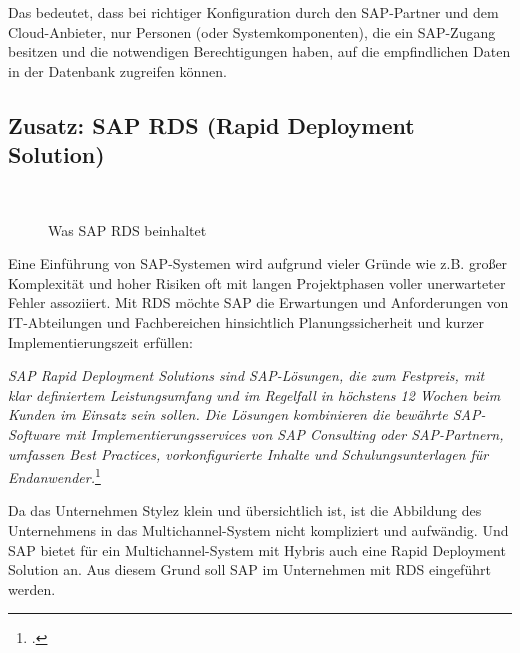 Das bedeutet, dass bei richtiger Konfiguration durch den SAP-Partner und dem Cloud-Anbieter, nur Personen (oder Systemkomponenten), die ein SAP-Zugang besitzen und die notwendigen Berechtigungen haben, auf die empfindlichen Daten in der Datenbank zugreifen können. 

\subsection{Zusatz: SAP RDS (Rapid Deployment Solution)}
\label{sec:RDS}
\begin{figure}[H]
\centering
\begin{minipage}[t]{1\textwidth}
{\centering{}\\}
\caption{Was SAP RDS beinhaltet} %
\end{minipage}
\end{figure}
Eine Einführung von SAP-Systemen wird aufgrund vieler Gründe wie z.B. großer Komplexität und hoher Risiken oft mit langen Projektphasen voller unerwarteter Fehler assoziiert. 
Mit \acrshort{RDS} möchte SAP die Erwartungen und Anforderungen von IT-Abteilungen und Fachbereichen hinsichtlich Planungssicherheit und kurzer Implementierungszeit erfüllen:

\textit{\glqq SAP Rapid Deployment Solutions sind SAP-Lösungen, die zum Festpreis, mit klar definiertem Leistungsumfang und im Regelfall in höchstens 12 Wochen beim Kunden im Einsatz sein sollen. Die Lösungen kombinieren die bewährte SAP-Software mit Implementierungsservices von SAP Consulting oder SAP-Partnern, umfassen Best Practices, vorkonfigurierte Inhalte und Schulungsunterlagen für Endanwender.\grqq}\footcite[Online im Internet.]{RDS}

Da das Unternehmen Stylez klein und übersichtlich ist, ist die Abbildung des Unternehmens in das Multichannel-System nicht kompliziert und aufwändig. Und SAP bietet für ein Multichannel-System mit Hybris auch eine Rapid Deployment Solution an. Aus diesem Grund soll SAP im Unternehmen mit RDS eingeführt werden.

